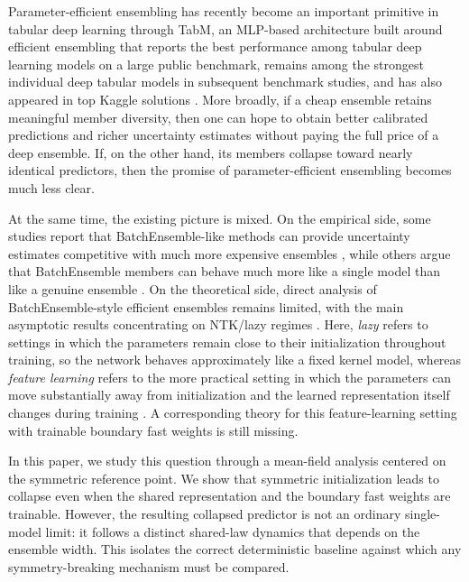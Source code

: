 \documentclass{article}
\begin{document}
Parameter-efficient ensembling has recently become an important primitive in tabular deep learning through TabM, an MLP-based architecture built around efficient ensembling that reports the best performance among tabular deep learning models on a large public benchmark, remains among the strongest individual deep tabular models in subsequent benchmark studies, and has also appeared in top Kaggle solutions \cite{gorishniy2025tabm,tabarena2025,gorishniy2025tabmrepo}. More broadly, if a cheap ensemble retains meaningful member diversity, then one can hope to obtain better calibrated predictions and richer uncertainty estimates without paying the full price of a deep ensemble. If, on the other hand, its members collapse toward nearly identical predictors, then the promise of parameter-efficient ensembling becomes much less clear.

At the same time, the existing picture is mixed. On the empirical side, some studies report that BatchEnsemble-like methods can provide uncertainty estimates competitive with much more expensive ensembles \cite{blorstad2026}, while others argue that BatchEnsemble members can behave much more like a single model than like a genuine ensemble \cite{zamyatin2026}. On the theoretical side, direct analysis of BatchEnsemble-style efficient ensembles remains limited, with the main asymptotic results concentrating on NTK/lazy regimes \cite{jacot2018,velikanov2022}. Here, \emph{lazy} refers to settings in which the parameters remain close to their initialization throughout training, so the network behaves approximately like a fixed kernel model, whereas \emph{feature learning} refers to the more practical setting in which the parameters can move substantially away from initialization and the learned representation itself changes during training \cite{yanghu2020}. A corresponding theory for this feature-learning setting with trainable boundary fast weights is still missing.

In this paper, we study this question through a mean-field analysis centered on the symmetric reference point. We show that symmetric initialization leads to collapse even when the shared representation and the boundary fast weights are trainable. However, the resulting collapsed predictor is not an ordinary single-model limit: it follows a distinct shared-law dynamics that depends on the ensemble width. This isolates the correct deterministic baseline against which any symmetry-breaking mechanism must be compared.
\end{document}
